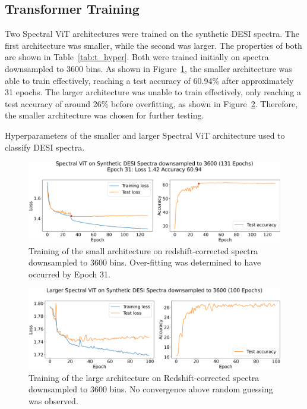 \subsection{Transformer Training}
\label{sec:transformer_training}
Two Spectral ViT architectures were trained on the synthetic DESI spectra.
The first architecture was smaller, while the second was larger. The properties 
of both are shown in Table~\ref{tab:t_hyper}. 
%     
Both were trained initially on spectra downsampled to 3600 bins. As shown in Figure~\ref{fig:vit1_training}, 
the smaller architecture was able to train effectively, reaching a test accuracy of 60.94\% after approximately 31 
epochs. The larger architecture was unable to train effectively, only reaching a test accuracy of around 26\% before 
overfitting, as shown in Figure~\ref{fig:vit1_big_training}. Therefore, the smaller architecture was chosen for further testing.

\begin{table}[t]
    \small
    \centering
    \sffamily
    
    \caption{Hyperparameters of the smaller and larger Spectral ViT architecture used to classify DESI spectra.}
    \label{tab:t_hyper}
\end{table}

\begin{figure}[b]
    \centering
    \includegraphics[width=.8\linewidth]{figures/v1_real/vit_model_V1_original_redotraining_new.png}
    \caption{Training of the small architecture on redshift-corrected spectra downsampled to 3600 bins. Over-fitting was determined to have occurred by Epoch 31.}
    \label{fig:vit1_training}
\end{figure}

\begin{figure}
    \centering
    \includegraphics[width=.8\linewidth]{figures/v1_real/vit_model_V1_bigtraining_new.png}
    \caption{Training of the large architecture on Redshift-corrected spectra downsampled to 3600 bins. No convergence above random guessing was observed. }
    \label{fig:vit1_big_training}
\end{figure}

